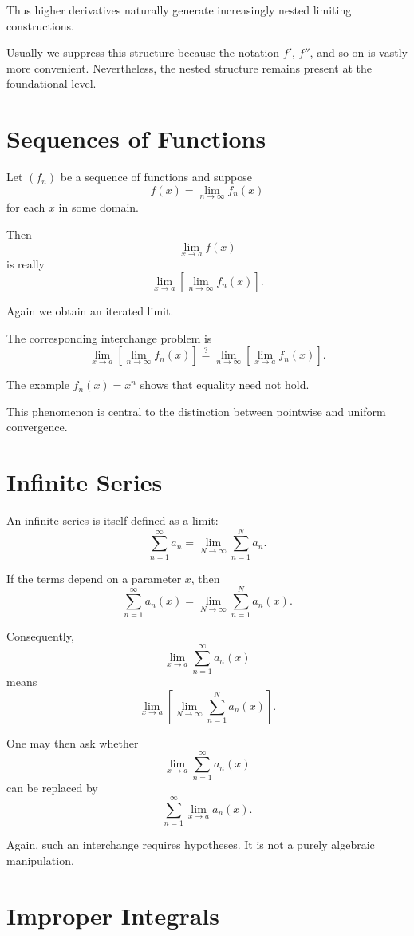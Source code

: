 \documentclass{essay}
\begin{document}
Thus higher derivatives naturally generate increasingly nested limiting constructions.

Usually we suppress this structure because the notation \(f'\), \(f''\), and so on is vastly more convenient. Nevertheless, the nested structure remains present at the foundational level.

\section{Sequences of Functions}

Let \((f_n)\) be a sequence of functions and suppose
\[
f(x)
=
\lim_{n\to\infty}f_n(x)
\]
for each \(x\) in some domain.

Then
\[
\lim_{x\to a}f(x)
\]
is really
\[
\lim_{x\to a}
\left[
\lim_{n\to\infty}f_n(x)
\right].
\]

Again we obtain an iterated limit.

The corresponding interchange problem is
\[
\lim_{x\to a}
\left[
\lim_{n\to\infty}f_n(x)
\right]
\stackrel{?}{=}
\lim_{n\to\infty}
\left[
\lim_{x\to a}f_n(x)
\right].
\]

The example \(f_n(x)=x^n\) shows that equality need not hold.

This phenomenon is central to the distinction between pointwise and uniform convergence.

\section{Infinite Series}

An infinite series is itself defined as a limit:
\[
\sum_{n=1}^{\infty}a_n
=
\lim_{N\to\infty}
\sum_{n=1}^{N}a_n.
\]

If the terms depend on a parameter \(x\), then
\[
\sum_{n=1}^{\infty}a_n(x)
=
\lim_{N\to\infty}
\sum_{n=1}^{N}a_n(x).
\]

Consequently,
\[
\lim_{x\to a}
\sum_{n=1}^{\infty}a_n(x)
\]
means
\[
\lim_{x\to a}
\left[
\lim_{N\to\infty}
\sum_{n=1}^{N}a_n(x)
\right].
\]

One may then ask whether
\[
\lim_{x\to a}
\sum_{n=1}^{\infty}a_n(x)
\]
can be replaced by
\[
\sum_{n=1}^{\infty}
\lim_{x\to a}a_n(x).
\]

Again, such an interchange requires hypotheses. It is not a purely algebraic manipulation.

\section{Improper Integrals}
\end{document}

